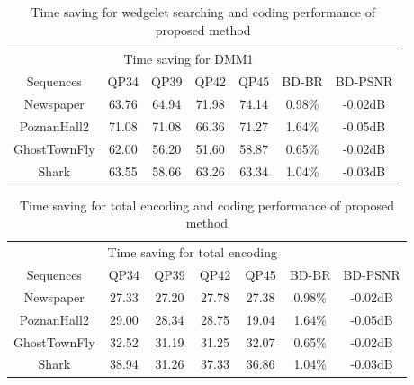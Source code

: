 \begin{table}[!htbp]
    \caption{Time saving for wedgelet searching and coding performance of proposed method}
    \bigskip\label{tab:ts-dmm}
    \centering
    \begin{tabular}{c c c c c c c}
        \toprule
         & \multicolumn{4}{c}{Time saving for DMM1} & & \\\cline{2-5}
        Sequences & QP34 & QP39 & QP42 & QP45 & BD-BR & BD-PSNR \\
        \midrule
        Newspaper       & 63.76 & 64.94 & 71.98 & 74.14 & 0.98\% & -0.02dB \\
        PoznanHall2    & 71.08 & 71.08 & 66.36 & 71.27 & 1.64\% & -0.05dB \\
        GhostTownFly       & 62.00 & 56.20 & 51.60 & 58.87 & 0.65\% & -0.02dB \\
        Shark           & 63.55 & 58.66 & 63.26 & 63.34 & 1.04\% & -0.03dB \\
    \end{tabular}
\end{table}

\begin{table}[!htbp]
    \caption{Time saving for total encoding and coding performance of proposed method}
    \bigskip\label{tab:ts-total}
    \centering
    \begin{tabular}{c c c c c c c}
        \toprule
         & \multicolumn{4}{c}{Time saving for total encoding} & & \\\cline{2-5}
        Sequences & QP34 & QP39 & QP42 & QP45 & BD-BR & BD-PSNR \\
        \midrule
        Newspaper       & 27.33 & 27.20 & 27.78 & 27.38 & 0.98\% & -0.02dB \\
        PoznanHall2     & 29.00 & 28.34 & 28.75 & 19.04 & 1.64\% & -0.05dB \\
        GhostTownFly    & 32.52 & 31.19 & 31.25 & 32.07 & 0.65\% & -0.02dB \\
        Shark           & 38.94 & 31.26 & 37.33 & 36.86 & 1.04\% & -0.03dB \\
    \end{tabular}
\end{table}

